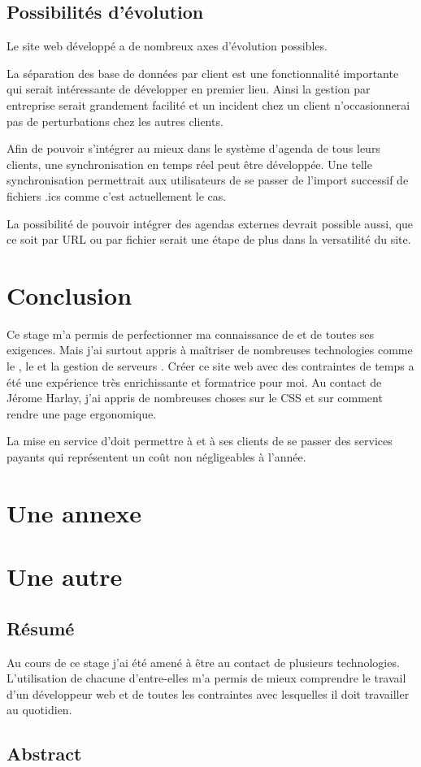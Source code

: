 \documentclass[a4paper, 11pt]{report}
\begin{document}
\section{Possibilités d'évolution}
    Le site web développé a de nombreux axes d'évolution possibles.

    La séparation des base de données par client est une fonctionnalité importante qui serait intéressante de développer en premier lieu. Ainsi la gestion par entreprise serait grandement facilité et un incident chez un client n’occasionnerai pas de perturbations chez les autres clients.

    Afin de pouvoir s'intégrer au mieux dans le système d'agenda de tous leurs clients, une synchronisation en temps réel peut être développée. Une telle synchronisation permettrait aux utilisateurs de se passer de l'import successif de fichiers .ics comme c'est actuellement le cas.

    La possibilité de pouvoir intégrer des agendas externes devrait possible aussi, que ce soit par URL ou par fichier serait une étape de plus dans la versatilité du site.

\chapter{Conclusion}
    Ce stage m'a permis de perfectionner ma connaissance de \symfony et de toutes ses exigences. Mais j'ai surtout appris à maîtriser de nombreuses technologies comme le \js, le \jq et la gestion de serveurs \njs. Créer ce site web avec des contraintes de temps a été une expérience très enrichissante et formatrice pour moi. Au contact de Jérome Harlay, j'ai appris de nombreuses choses sur le CSS et sur comment rendre une page ergonomique.

    La mise en service d'\agenda doit permettre à \lgk et à ses clients de se passer des services payants qui représentent un coût non négligeables à l'année.

\appendix
    \chapter{Une annexe}
    \chapter{Une autre}




\newpage
\thispagestyle{empty}
    \section*{Résumé}
    Au cours de ce stage j'ai été amené à être au contact de plusieurs technologies. L'utilisation de chacune d'entre-elles m'a permis de mieux comprendre le travail d'un développeur web et de toutes les contraintes avec lesquelles il doit travailler au quotidien.
    \section*{Abstract}
\end{document}
